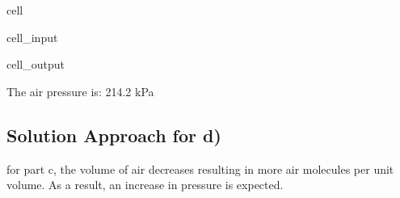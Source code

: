 \documentclass[letterpaper,10pt,english]{jupyterBook}
\begin{document}
\begin{sphinxuseclass}{cell}\begin{sphinxVerbatimInput}

\begin{sphinxuseclass}{cell_input}
\begin{sphinxVerbatim}[commandchars=\\\{\}]
   
         
  
\end{sphinxVerbatim}

\end{sphinxuseclass}\end{sphinxVerbatimInput}
\begin{sphinxVerbatimOutput}

\begin{sphinxuseclass}{cell_output}
\begin{sphinxVerbatim}[commandchars=\\\{\}]
The air pressure is: 214.2 kPa
\end{sphinxVerbatim}

\end{sphinxuseclass}\end{sphinxVerbatimOutput}

\end{sphinxuseclass}

\subsection{Solution Approach for d)}
\label{\detokenize{notebooks/Chapter3/CH3-Q1_v1:solution-approach-for-d}}
\sphinxAtStartPar
for part c, the volume of air decreases resulting in more air molecules per unit volume. As a result, an increase in pressure is expected.
\end{document}
